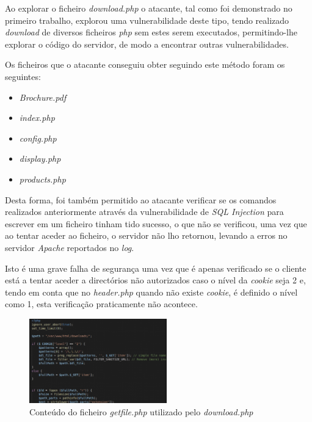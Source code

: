 \documentclass[10pt,english]{article}
\begin{document}
\par Ao explorar o ficheiro \textit{download.php} o atacante, tal como foi demonstrado no primeiro trabalho, explorou uma vulnerabilidade deste tipo, tendo realizado \textit{download} de diversos ficheiros \textit{php} sem estes serem executados, permitindo-lhe explorar o código do servidor, de modo a encontrar outras vulnerabilidades. 

\par Os ficheiros que o atacante conseguiu obter seguindo este método foram os seguintes:

\begin{itemize}
    \item \textit{Brochure.pdf}
    \item \textit{index.php}
    \item \textit{config.php}
    \item \textit{display.php}
    \item \textit{products.php}
\end{itemize}

\par Desta forma, foi também permitido ao atacante verificar se os comandos realizados anteriormente através da vulnerabilidade de \textit{SQL Injection} para escrever em um ficheiro tinham tido sucesso, o que não se verificou, uma vez que ao tentar aceder ao ficheiro, o servidor não lho retornou, levando a erros no servidor \textit{Apache} reportados no \textit{log}.

\par Isto é uma grave falha de segurança uma vez que é apenas verificado se o cliente está a tentar aceder a directórios não autorizados caso o nível da \textit{cookie} seja 2 e, tendo em conta que no \textit{header.php} quando não existe \textit{cookie}, é definido o nível como 1, esta verificação praticamente não acontece.

\begin{figure}[h]
    \centering
    \includegraphics[width=225]{images/downloadphp.png}
    \caption{Conteúdo do ficheiro \textit{getfile.php} utilizado pelo \textit{download.php}}
\end{figure}
\end{document}
